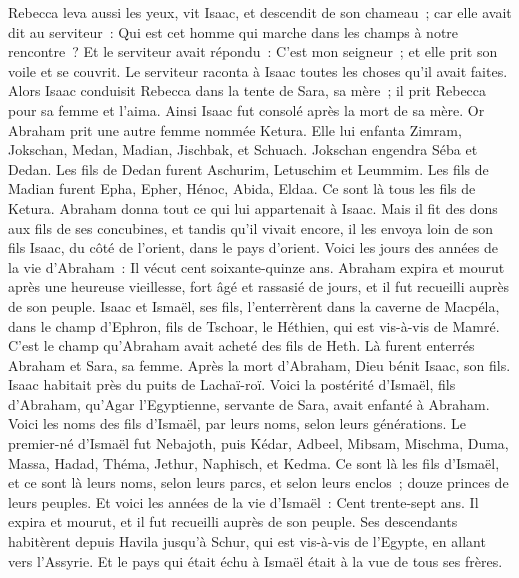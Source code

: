 \begin{multicols}{2}
Rebecca leva aussi les yeux, vit Isaac, et descendit de son chameau~;
car elle avait dit au serviteur~: Qui est cet homme qui marche dans les champs à notre rencontre~? Et le serviteur avait répondu~: C'est mon seigneur~; et elle prit son voile et se couvrit.
Le serviteur raconta à Isaac toutes les choses qu'il avait faites.
Alors Isaac conduisit Rebecca dans la tente de Sara, sa mère~; il prit Rebecca pour sa femme et l'aima. Ainsi Isaac fut consolé après la mort de sa mère.
\VerseOne{}Or Abraham prit une autre femme nommée Ketura.
Elle lui enfanta Zimram, Jokschan, Medan, Madian, Jischbak, et Schuach.
Jokschan engendra Séba et Dedan. Les fils de Dedan furent Aschurim, Letuschim et Leummim.
Les fils de Madian furent Epha, Epher, Hénoc, Abida, Eldaa. Ce sont là tous les fils de Ketura.
Abraham donna tout ce qui lui appartenait à Isaac.
Mais il fit des dons aux fils de ses concubines, et tandis qu'il vivait encore, il les envoya loin de son fils Isaac, du côté de l'orient, dans le pays d'orient.
Voici les jours des années de la vie d'Abraham~: Il vécut cent soixante-quinze ans.
Abraham expira et mourut après une heureuse vieillesse, fort âgé et rassasié de jours, et il fut recueilli auprès de son peuple.
Isaac et Ismaël, ses fils, l'enterrèrent dans la caverne de Macpéla, dans le champ d'Ephron, fils de Tschoar, le Héthien, qui est vis-à-vis de Mamré.
C'est le champ qu'Abraham avait acheté des fils de Heth. Là furent enterrés Abraham et Sara, sa femme.
Après la mort d'Abraham, Dieu bénit Isaac, son fils. Isaac habitait près du puits de Lachaï-roï.
Voici la postérité d'Ismaël, fils d'Abraham, qu'Agar l'Egyptienne, servante de Sara, avait enfanté à Abraham.
Voici les noms des fils d'Ismaël, par leurs noms, selon leurs générations. Le premier-né d'Ismaël fut Nebajoth, puis Kédar, Adbeel, Mibsam,
Mischma, Duma, Massa,
Hadad, Théma, Jethur, Naphisch, et Kedma.
Ce sont là les fils d'Ismaël, et ce sont là leurs noms, selon leurs parcs, et selon leurs enclos~; douze princes de leurs peuples.
Et voici les années de la vie d'Ismaël~: Cent trente-sept ans. Il expira et mourut, et il fut recueilli auprès de son peuple.
Ses descendants habitèrent depuis Havila jusqu'à Schur, qui est vis-à-vis de l'Egypte, en allant vers l'Assyrie. Et le pays qui était échu à Ismaël était à la vue de tous ses frères.

\end{multicols}
